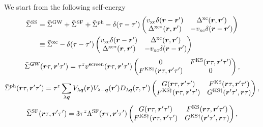 We start from the following self-energy
%
\begin{equation}
	\begin{split}
	\bar{\Sigma}^{\rm SS} &= \bar{\Sigma}^{\rm GW} + \bar{\Sigma}^{\rm SF} + \bar{\Sigma}^{\rm ph}
	-\delta(\tau - \tau') 
	\begin{pmatrix}
		 v_{\rm xc}\delta(\bm r - \bm r')  &   \Delta^{\rm xc}(\bm r, \bm r')   \\
		 \Delta^{\rm xc\ast}(\bm r, \bm r')  & - v_{\rm xc}\delta(\bm r - \bm r')
	\end{pmatrix} \\
	& \equiv \bar{\Sigma}^{\rm xc} - \delta(\tau - \tau')
	\begin{pmatrix}
		 v_{\rm xc}\delta(\bm r - \bm r')  &   \Delta^{\rm xc}(\bm r, \bm r')   \\
		 \Delta^{\rm xc\ast}(\bm r, \bm r')  & - v_{\rm xc}\delta(\bm r - \bm r')
	\end{pmatrix} \\
	\label{eq:appSSself}
\end{split}
\end{equation}
%
\begin{equation}
	\bar{\Sigma}^{\rm GW}(\bm r \tau, \bm r' \tau') = \tau^z v^{\rm screen}(\bm r \tau, \bm r' \tau')
	\begin{pmatrix}
		0  &   F^{\rm KS}(\bm r \tau, \bm r' \tau')   \\
		F^{\rm KS\dag}(\bm r \tau, \bm r' \tau')  & 0
	\end{pmatrix},
	\label{eq:GWself}
\end{equation}
%
\begin{equation}
	\bar{\Sigma}^{\rm ph}(\bm r \tau, \bm r' \tau') = \tau^z \sum_{\lambda \bm q}
	V_{\lambda \bm q}(\bm r)V_{\lambda -\bm q}(\bm r') D_{\lambda\bm q}(\tau, \tau')
	\begin{pmatrix}
		G(\bm r \tau, \bm r' \tau')  &   F^{\rm KS}(\bm r \tau, \bm r' \tau')   \\
		F^{\rm KS\dag}(\bm r \tau, \bm r' \tau')  & G^{\rm KS\dag}(\bm r' \tau', \bm r \tau)
	\end{pmatrix},
	\label{eq:phself}
\end{equation}
%
\begin{equation}
	\bar{\Sigma}^{\rm SF}(\bm r \tau, \bm r' \tau') = 3\tau^z 
	\Lambda^{\rm SF}(\bm r \tau, \bm r' \tau')
	\begin{pmatrix}
		G(\bm r \tau, \bm r' \tau')  &   F^{\rm KS}(\bm r \tau, \bm r' \tau')   \\
		F^{\rm KS\dag}(\bm r \tau, \bm r' \tau')  & G^{\rm KS\dag}(\bm r' \tau', \bm r \tau)
	\end{pmatrix},
	\label{eq:SFself}
\end{equation}
